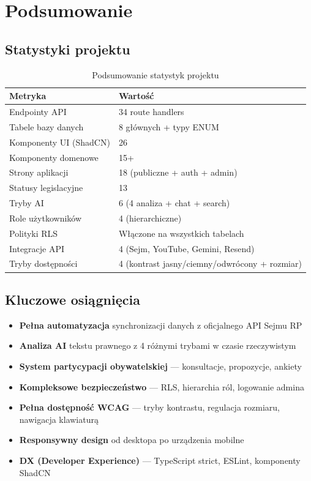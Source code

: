 \documentclass[12pt,a4paper]{article}
\begin{document}
\newpage

\section{Podsumowanie}

\subsection{Statystyki projektu}

\begin{table}[H]
\centering
\renewcommand{\arraystretch}{1.4}
\begin{tabularx}{\textwidth}{l X}
\toprule
\textbf{Metryka} & \textbf{Wartość} \\
\midrule
Endpointy API & 34 route handlers \\
Tabele bazy danych & 8 głównych + typy ENUM \\
Komponenty UI (ShadCN) & 26 \\
Komponenty domenowe & 15+ \\
Strony aplikacji & 18 (publiczne + auth + admin) \\
Statusy legislacyjne & 13 \\
Tryby AI & 6 (4 analiza + chat + search) \\
Role użytkowników & 4 (hierarchiczne) \\
Polityki RLS & Włączone na wszystkich tabelach \\
Integracje API & 4 (Sejm, YouTube, Gemini, Resend) \\
Tryby dostępności & 4 (kontrast jasny/ciemny/odwrócony + rozmiar) \\
\bottomrule
\end{tabularx}
\caption{Podsumowanie statystyk projektu}
\end{table}

\subsection{Kluczowe osiągnięcia}

\begin{itemize}[leftmargin=2em]
  \item \textbf{Pełna automatyzacja} synchronizacji danych z oficjalnego API Sejmu RP
  \item \textbf{Analiza AI} tekstu prawnego z 4 różnymi trybami w czasie rzeczywistym
  \item \textbf{System partycypacji obywatelskiej} — konsultacje, propozycje, ankiety
  \item \textbf{Kompleksowe bezpieczeństwo} — RLS, hierarchia ról, logowanie admina
  \item \textbf{Pełna dostępność WCAG} — tryby kontrastu, regulacja rozmiaru, nawigacja klawiaturą
  \item \textbf{Responsywny design} od desktopa po urządzenia mobilne
  \item \textbf{DX (Developer Experience)} — TypeScript strict, ESLint, komponenty ShadCN
\end{itemize}
\end{document}
